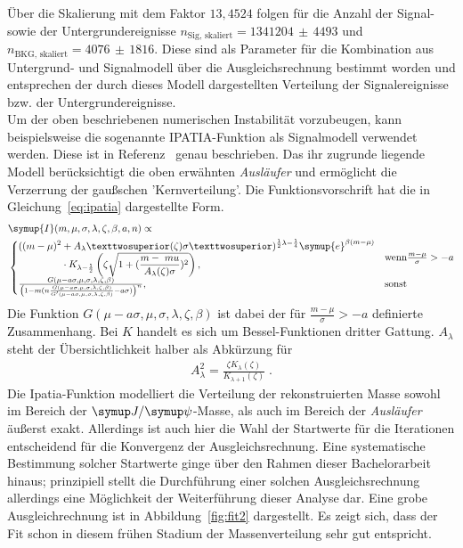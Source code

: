 %
Über die Skalierung mit dem Faktor $13,4524$ folgen für die Anzahl der Signal- sowie der Untergrundereignisse $n_\text{Sig, skaliert}=1341204\,\pm\,4493$ und $n_\text{BKG, skaliert}=4076\,\pm\,1816$. Diese sind als Parameter für die Kombination aus Untergrund- und Signalmodell über die Ausgleichsrechnung bestimmt worden und entsprechen der durch dieses Modell dargestellten Verteilung der Signalereignisse bzw. der Untergrundereignisse.\\
Um der oben beschriebenen numerischen Instabilität vorzubeugen, kann beispielsweise die sogenannte IPATIA-Funktion als Signalmodell verwendet werden. Diese ist in Referenz~\cite{ipatia} genau beschrieben. Das ihr zugrunde liegende Modell berücksichtigt die oben erwähnten \textit{Ausläufer} und ermöglicht die Verzerrung der gaußschen 'Kernverteilung'. Die Funktionsvorschrift hat die in Gleichung~\ref{eq:ipatia} dargestellte Form.
%
\begin{equation}
  \begin{split}
  &\symup{I}(m,\mu,\sigma,\lambda,\zeta,\beta,a,n)\propto\\
    &\begin{cases}
      \begin{split}
      ((m-\mu)^2&+A_\lambda²(\zeta)\sigma²)^{\frac{1}{2}\lambda-\frac{1}{4}}\symup{e}^{\beta(m-\mu)}\\
      &\cdot K_{\lambda-\frac{1}{2}}\left(\zeta\sqrt{1+(\frac{m-\ mu}{A_\lambda(\zeta)\sigma})^2}\right),
      \end{split} & \text{wenn} \frac{m-\mu}{\sigma}>-a \\
      \frac{G(\mu-a\sigma,\mu,\sigma,\lambda,\zeta,\beta)}{\left(1-m\/(n\frac{G(\mu-a\sigma,\mu,\sigma,\lambda,\zeta,\beta)}{G'(\mu-a\sigma,\mu,\sigma,\lambda,\zeta,\beta)}-a\sigma)\right)^n} ,& \text{sonst}
    \end{cases}
  \end{split}
  \label{eq:ipatia}
\end{equation}
%
Die Funktion $G(\mu-a\sigma,\mu,\sigma,\lambda,\zeta,\beta)$ ist dabei der für $\frac{m-\mu}{\sigma}>-a$ definierte Zusammenhang. Bei $K$
handelt es sich um Bessel-Funktionen dritter Gattung. $A_\lambda$ steht der Übersichtlichkeit halber als Abkürzung für
%
\begin{align*}
  A_\lambda^2=\frac{\zeta K_\lambda(\zeta)}{K_{\lambda+1}(\zeta)}\; .
\end{align*}
%
Die Ipatia-Funktion modelliert die Verteilung der rekonstruierten Masse sowohl im Bereich der $\jpsi$-Masse, als auch im Bereich der \textit{Ausläufer} äußerst exakt. Allerdings ist auch hier die Wahl der Startwerte für die Iterationen entscheidend für die Konvergenz der Ausgleichsrechnung. Eine systematische Bestimmung solcher Startwerte ginge über den Rahmen dieser Bachelorarbeit hinaus; prinzipiell stellt die Durchführung einer solchen Ausgleichsrechnung allerdings eine Möglichkeit der Weiterführung dieser Analyse dar. Eine grobe Ausgleichrechnung ist in Abbildung~\ref{fig:fit2} dargestellt. Es zeigt sich, dass der Fit schon in diesem frühen Stadium der Massenverteilung sehr gut entspricht.
